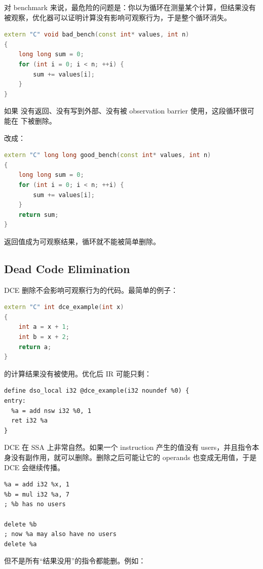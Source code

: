 对 benchmark 来说，最危险的问题是：你以为循环在测量某个计算，但结果没有被观察，优化器可以证明计算没有影响可观察行为，于是整个循环消失。

\begin{lstlisting}[language=C++]
extern "C" void bad_bench(const int* values, int n)
{
    long long sum = 0;
    for (int i = 0; i < n; ++i) {
        sum += values[i];
    }
}
\end{lstlisting}

如果  没有返回、没有写到外部、没有被 observation barrier 使用，这段循环很可能在  下被删除。

改成：

\begin{lstlisting}[language=C++]
extern "C" long long good_bench(const int* values, int n)
{
    long long sum = 0;
    for (int i = 0; i < n; ++i) {
        sum += values[i];
    }
    return sum;
}
\end{lstlisting}

返回值成为可观察结果，循环就不能被简单删除。

\subsection{Dead Code Elimination}

DCE 删除不会影响可观察行为的代码。最简单的例子：

\begin{lstlisting}[language=C++]
extern "C" int dce_example(int x)
{
    int a = x + 1;
    int b = x + 2;
    return a;
}
\end{lstlisting}

 的计算结果没有被使用。优化后 IR 可能只剩：

\begin{lstlisting}
define dso_local i32 @dce_example(i32 noundef %0) {
entry:
  %a = add nsw i32 %0, 1
  ret i32 %a
}
\end{lstlisting}

DCE 在 SSA 上非常自然。如果一个 instruction 产生的值没有 users，并且指令本身没有副作用，就可以删除。删除之后可能让它的 operands 也变成无用值，于是 DCE 会继续传播。

\begin{lstlisting}
%a = add i32 %x, 1
%b = mul i32 %a, 7
; %b has no users

delete %b
; now %a may also have no users
delete %a
\end{lstlisting}

但不是所有“结果没用”的指令都能删。例如：


